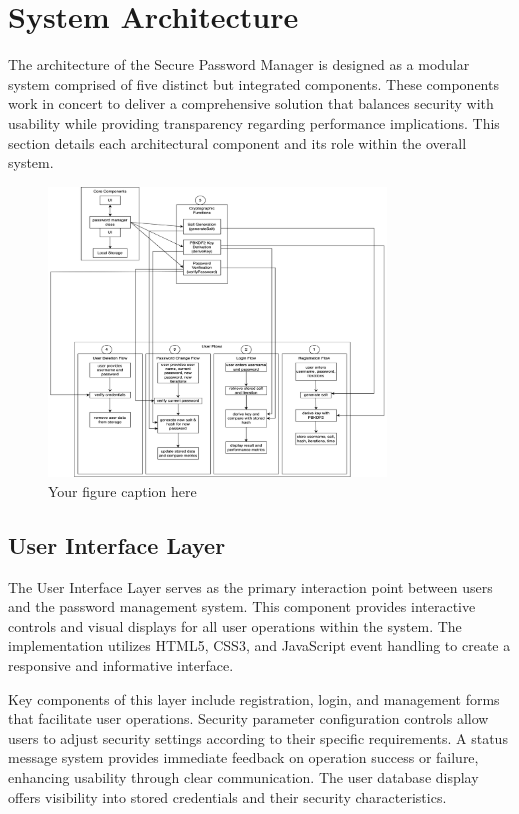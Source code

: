 \documentclass[11pt,a4paper]{article}
\begin{document}
\section{System Architecture}
The architecture of the Secure Password Manager is designed as a modular system comprised of five distinct but integrated components. These components work in concert to deliver a comprehensive solution that balances security with usability while providing transparency regarding performance implications. This section details each architectural component and its role within the overall system.
\begin{figure}
    \centering
    \includegraphics[width=0.8\textwidth]{images/system_design.png}
    \caption{Your figure caption here}
    \label{fig:your-label}
\end{figure}

\subsection{User Interface Layer}
The User Interface Layer serves as the primary interaction point between users and the password management system. This component provides interactive controls and visual displays for all user operations within the system. The implementation utilizes HTML5, CSS3, and JavaScript event handling to create a responsive and informative interface.

Key components of this layer include registration, login, and management forms that facilitate user operations. Security parameter configuration controls allow users to adjust security settings according to their specific requirements. A status message system provides immediate feedback on operation success or failure, enhancing usability through clear communication. The user database display offers visibility into stored credentials and their security characteristics.
\end{document}
